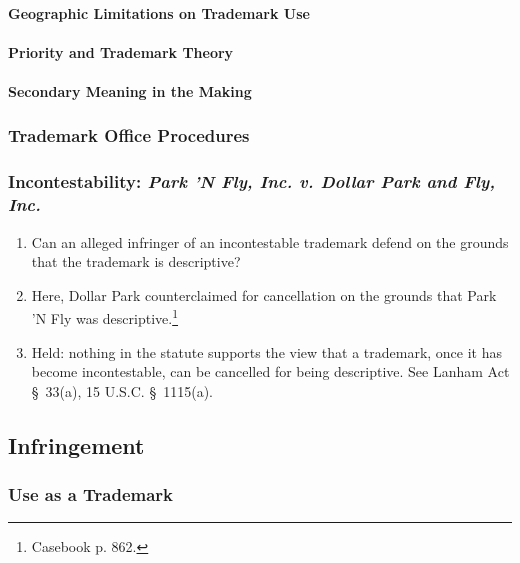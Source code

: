 \paragraph{Geographic Limitations on Trademark Use}


\paragraph{Priority and Trademark Theory}


\paragraph{Secondary Meaning in the Making}


\subsubsection{Trademark Office Procedures}


\subsubsection{Incontestability: \emph{Park 'N Fly, Inc. v. Dollar Park and 
Fly, Inc.}}

\begin{enumerate}
    \item Can an alleged infringer of an incontestable trademark defend on the 
    grounds that the trademark is descriptive?
    \item Here, Dollar Park counterclaimed for cancellation on the grounds 
    that Park 'N Fly was descriptive.\footnote{Casebook p. 862.}
    \item Held: nothing in the statute supports the view that a trademark, 
    once it has become incontestable, can be cancelled for being descriptive. 
    See Lanham Act \S\ 33(a), 15 U.S.C. \S\ 1115(a).
\end{enumerate}

\subsection{Infringement}

\subsubsection{Use as a Trademark}

